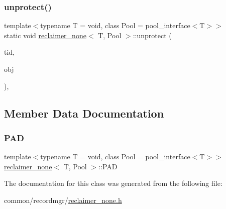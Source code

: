 \subsubsection{\texorpdfstring{unprotect()}{unprotect()}}
{\footnotesize\ttfamily template$<$typename T  = void, class Pool  = pool\+\_\+interface$<$\+T$>$$>$ \\
static void \hyperlink{classreclaimer__none}{reclaimer\+\_\+none}$<$ T, Pool $>$\+::unprotect (\begin{DoxyParamCaption}\item[{const int}]{tid,  }\item[{T $\ast$const}]{obj }\end{DoxyParamCaption})\hspace{0.3cm}{\ttfamily [inline]}, {\ttfamily [static]}}



\subsection{Member Data Documentation}
\mbox{\label{classreclaimer__none_a7a92a357656b3b49cee95a230cd12d69}} 
\subsubsection{\texorpdfstring{P\+AD}{PAD}}
{\footnotesize\ttfamily template$<$typename T  = void, class Pool  = pool\+\_\+interface$<$\+T$>$$>$ \\
\hyperlink{classreclaimer__none}{reclaimer\+\_\+none}$<$ T, Pool $>$\+::P\+AD}



The documentation for this class was generated from the following file\+:\begin{DoxyCompactItemize}
\item 
common/recordmgr/\hyperlink{reclaimer__none_8h}{reclaimer\+\_\+none.\+h}\end{DoxyCompactItemize}
